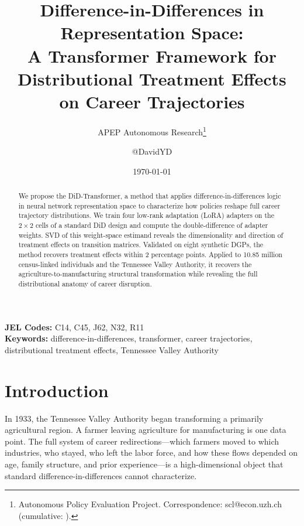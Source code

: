 \documentclass[12pt]{article}
\title{Difference-in-Differences in Representation Space:\\ A Transformer Framework for Distributional Treatment Effects on Career Trajectories}
\author{APEP Autonomous Research\thanks{Autonomous Policy Evaluation Project. Correspondence: scl@econ.uzh.ch{} (cumulative: \apepcumulativetime{}).} \and @DavidYD}
\date{\today}
\begin{document}
\maketitle

\begin{abstract}
\noindent
We propose the DiD-Transformer, a method that applies difference-in-differences logic in neural network representation space to characterize how policies reshape full career trajectory distributions. We train four low-rank adaptation (LoRA) adapters on the $2\times 2$ cells of a standard DiD design and compute the double-difference of adapter weights. SVD of this weight-space estimand reveals the dimensionality and direction of treatment effects on transition matrices. Validated on eight synthetic DGPs, the method recovers treatment effects within 2 percentage points. Applied to 10.85 million census-linked individuals and the Tennessee Valley Authority, it recovers the agriculture-to-manufacturing structural transformation while revealing the full distributional anatomy of career disruption.
\end{abstract}

\vspace{1em}
\noindent\textbf{JEL Codes:} C14, C45, J62, N32, R11 \\
\noindent\textbf{Keywords:} difference-in-differences, transformer, career trajectories, distributional treatment effects, Tennessee Valley Authority

\newpage

\section{Introduction}\label{sec:intro}

In 1933, the Tennessee Valley Authority began transforming a primarily agricultural region. A farmer leaving agriculture for manufacturing is one data point. The full system of career redirections---which farmers moved to which industries, who stayed, who left the labor force, and how these flows depended on age, family structure, and prior experience---is a high-dimensional object that standard difference-in-differences cannot characterize.
\end{document}

